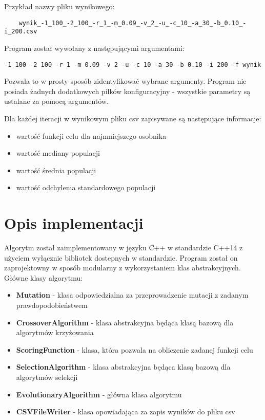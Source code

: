 \documentclass[12pt]{article}
\makeatletter
\newcommand{\verbatimfont}[1]{\renewcommand{\verbatim@font}{\ttfamily#1}}
\makeatother
\begin{document}
Przykład nazwy pliku wynikowego: 
\verbatimfont{\footnotesize}
\begin{verbatim}
	wynik_-1_100_-2_100_-r_1_-m_0.09_-v_2_-u_-c_10_-a_30_-b_0.10_-i_200.csv
\end{verbatim}

Program został wywołany z następującymi argumentami:
\verbatimfont{\footnotesize}
\begin{verbatim}
-1 100 -2 100 -r 1 -m 0.09 -v 2 -u -c 10 -a 30 -b 0.10 -i 200 -f wynik
\end{verbatim}

Pozwala to w prosty sposób zidentyfikować wybrane argumenty. Program nie posiada żadnych dodatkowych pilków konfiguracyjny - wszystkie parametry są ustalane za pomocą argumentów. 

\bigskip

Dla każdej iteracji w wynikowym pliku csv zapisywane są następujące informacje:
\begin{itemize}
	\item{wartość funkcji celu dla najmniejszego osobnika}
	\item{wartość mediany populacji}
	\item{wartość średnia populacji}
	\item{wartość odchylenia standardowego populacji}
\end{itemize}

\section{Opis implementacji}
Algorytm został zaimplementowany w języku C++ w standardzie C++14 z użyciem wyłącznie bibliotek dostepnych w standardzie. Program został on zaprojektowny w sposób modularny z wykorzystaniem klas abstrakcyjnych. Główne klasy algorytmu:

\begin{itemize}
	\item{\textbf{Mutation} - klasa odpowiedzialna za przeprowadzenie mutacji z zadanym prawdopodobieństwem}
	\item{\textbf{CrossoverAlgorithm} - klasa abstrakcyjna będąca klasą bazową dla algorytmów krzyżowania}
	\item{\textbf{ScoringFunction} - klasa, która pozwala na obliczenie zadanej funkcji celu}
	\item{\textbf{SelectionAlgorithm} - klasa abstrakcyjna będąca klasą bazową dla algorytmów selekcji}
	\item{\textbf{EvolutionaryAlgorithm} - główna klasa algorytmu}
	\item{\textbf{CSVFileWriter} - klasa opowiadająca za zapis wyników do pliku csv} 
\end{itemize}
\end{document}
